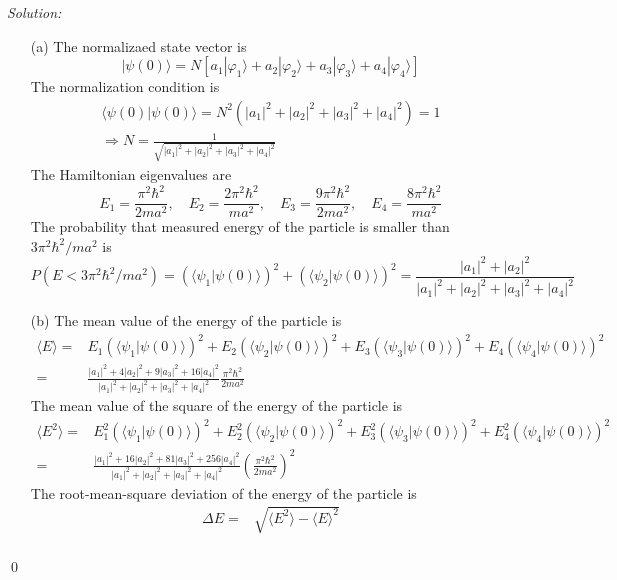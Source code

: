 \documentclass[12pt,a4paper]{article}
\newenvironment{sol}
    {\emph{Solution:}
    }
    {
    \qed
    }
\begin{document}
\begin{sol}
\begin{itemize}
\item[(a)] The normalizaed state vector is
\begin{equation}
|\psi(0)\rangle=N[a_1|\varphi_1\rangle+a_2|\varphi_2\rangle+a_3|\varphi_3\rangle+a_4|\varphi_4\rangle]
\end{equation}
The normalization condition is
\begin{gather}
\langle\psi(0)|\psi(0)\rangle=N^2(|a_1|^2+|a_2|^2+|a_3|^2+|a_4|^2)=1\\
\Longrightarrow N=\frac{1}{\sqrt{|a_1|^2+|a_2|^2+|a_3|^2+|a_4|^2}}
\end{gather}
The Hamiltonian eigenvalues are
\begin{equation}
E_1=\frac{\pi^2\hbar^2}{2ma^2},\quad E_2=\frac{2\pi^2\hbar^2}{ma^2},\quad E_3=\frac{9\pi^2\hbar^2}{2ma^2},\quad E_4=\frac{8\pi^2\hbar^2}{ma^2}
\end{equation}
The probability that measured energy of the particle is smaller than $3\pi^2\hbar^2/ma^2$ is
\begin{equation}
P(E<3\pi^2\hbar^2/ma^2)=(\langle\psi_1|\psi(0)\rangle)^2+(\langle\psi_2|\psi(0)\rangle)^2=\frac{|a_1|^2+|a_2|^2}{|a_1|^2+|a_2|^2+|a_3|^2+|a_4|^2}
\end{equation}
\item[(b)] The mean value of the energy of the particle is
\begin{align}
\nonumber\langle E\rangle=&E_1(\langle\psi_1|\psi(0)\rangle)^2+E_2(\langle\psi_2|\psi(0)\rangle)^2+E_3(\langle\psi_3|\psi(0)\rangle)^2+E_4(\langle\psi_4|\psi(0)\rangle)^2\\
=&\frac{|a_1|^2+4|a_2|^2+9|a_3|^2+16|a_4|^2}{|a_1|^2+|a_2|^2+|a_3|^2+|a_4|^2}\frac{\pi^2\hbar^2}{2ma^2}
\end{align}
The mean value of the square of the energy of the particle is
\begin{align}
\nonumber\langle E^2\rangle=&E_1^2(\langle\psi_1|\psi(0)\rangle)^2+E_2^2(\langle\psi_2|\psi(0)\rangle)^2+E_3^2(\langle\psi_3|\psi(0)\rangle)^2+E_4^2(\langle\psi_4|\psi(0)\rangle)^2\\
=&\frac{|a_1|^2+16|a_2|^2+81|a_3|^2+256|a_4|^2}{|a_1|^2+|a_2|^2+|a_3|^2+|a_4|^2}\left(\frac{\pi^2\hbar^2}{2ma^2}\right)^2
\end{align}
The root-mean-square deviation of the energy of the particle is
\scriptsize\begin{align}
\nonumber\Delta E=&\sqrt{\langle E^2\rangle-\langle E\rangle^2}\\

\end{align}
\end{itemize}
\end{sol}
\end{document}
